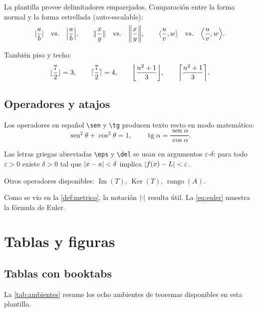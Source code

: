 \documentclass[letterpaper, 11pt]{article}
\newcommand{\eps}{\varepsilon}
\newcommand{\del}{\delta}
\DeclarePairedDelimiter{\abs}{\lvert}{\rvert}
\DeclarePairedDelimiter{\norm}{\lVert}{\rVert}
\DeclarePairedDelimiter{\inner}{\langle}{\rangle}
\DeclarePairedDelimiter{\ceil}{\lceil}{\rceil}
\DeclarePairedDelimiter{\floor}{\lfloor}{\rfloor}
\DeclareMathOperator{\sen}{sen}
\DeclareMathOperator{\tg}{tg}
\DeclareMathOperator{\Img}{Im}
\DeclareMathOperator{\Ker}{Ker}
\DeclareMathOperator{\rango}{rango}
\begin{document}
La plantilla provee delimitadores emparejados. Comparación entre la
forma normal y la forma estrellada (auto-escalable):
\[
    \abs{\frac{a}{b}}
    \quad\text{vs.}\quad
    \abs*{\frac{a}{b}}, \qquad
    \norm{\frac{x}{y}}
    \quad\text{vs.}\quad
    \norm*{\frac{x}{y}}, \qquad
    \inner{\frac{u}{v}, w}
    \quad\text{vs.}\quad
    \inner*{\frac{u}{v}, w}.
\]

También piso y techo:
\[
    \floor{\frac{7}{2}} = 3, \qquad
    \ceil{\frac{7}{2}} = 4, \qquad
    \floor*{\frac{n^2+1}{3}}, \qquad
    \ceil*{\frac{n^2+1}{3}}.
\]

\subsection{Operadores y atajos}

Los operadores en español \verb|\sen| y \verb|\tg| producen texto
recto en modo matemático:
\[
    \sen^2\theta + \cos^2\theta = 1,
    \qquad
    \tg\alpha = \frac{\sen\alpha}{\cos\alpha}.
\]

Las letras griegas abreviadas \verb|\eps| y \verb|\del| se usan en
argumentos $\eps$-$\del$: para todo $\eps > 0$ existe $\del > 0$
tal que $\abs{x - a} < \del$ implica $\abs{f(x) - L} < \eps$.

Otros operadores disponibles: $\Img(T)$, $\Ker(T)$, $\rango(A)$.

Como se vio en la \cref{def:metrico}, la notación $\abs{\cdot}$
resulta útil. La \cref{eq:euler} muestra la fórmula de Euler.

\section{Tablas y figuras}\label{sec:tablas}

\subsection{Tablas con booktabs}

La \cref{tab:ambientes} resume los ocho ambientes de teoremas
disponibles en esta plantilla.
\end{document}
